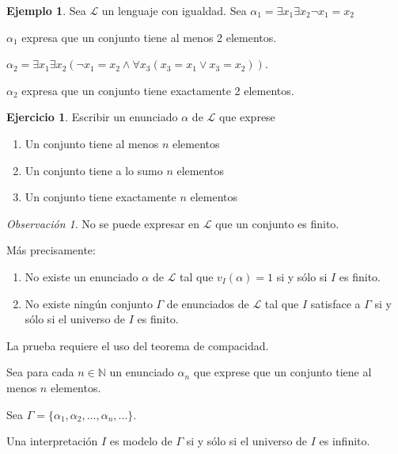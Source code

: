 \documentclass[a4paper,11pt]{article}
\theoremstyle{definition}
\newtheorem{exap}{Ejemplo}[section]
\newtheorem*{ejer}{Ejercicio}
\theoremstyle{remark}
\newtheorem*{remk}{Observación}
\def\NN{\mathbb{N}}
\def\LL{\ensuremath{\mathcal{L}}}
\begin{document}
\begin{exap}
    Sea $\LL$ un lenguaje con igualdad. Sea 
    $\alpha_1 = \exists x_1 \exists x_2 \lnot x_1 = x_2$
    
    $\alpha_1$ expresa que un conjunto tiene al menos 2 elementos.
    
    $\alpha_2 = \exists x_1 \exists x_2 (\lnot x_1 = x_2 \land 
    \forall x_3 (x_3 = x_1 \lor x_3 = x_2))$.
    
    $\alpha_2$ expresa que un conjunto tiene exactamente 2 elementos.
\end{exap}

\begin{ejer}
    Escribir un enunciado $\alpha$ de $\LL$ que exprese
    
    \begin{enumerate}[label=\emph{\alph*})]
        \item Un conjunto tiene al menos $n$ elementos
        
        \item Un conjunto tiene a lo sumo $n$ elementos
        
        \item Un conjunto tiene exactamente $n$ elementos
    \end{enumerate}
\end{ejer}

\begin{remk}
    No se puede expresar en $\LL$ que un conjunto es finito.
    
    Más precisamente:

    \begin{enumerate}[label=\emph{\alph*})]
        \item No existe un enunciado $\alpha$ de $\LL$ tal que
        $v_I(\alpha) = 1$ si y sólo si $I$ es finito.
        
        \item No existe ningún conjunto $\Gamma$ de enunciados
        de $\LL$ tal que $I$ satisface a $\Gamma$ si y sólo si
        el universo de $I$ es finito.
    \end{enumerate}

    La prueba requiere el uso del teorema de compacidad.
    
    Sea para cada $n \in \NN$ un enunciado $\alpha_n$ que
    exprese que un conjunto tiene al menos $n$ elementos.
    
    Sea $\Gamma = \{ \alpha_1, \alpha_2, \dots,\alpha_n, \dots \}$.
    
    Una interpretación $I$ es modelo de $\Gamma$ si y sólo si
    el universo de $I$ es infinito.
\end{remk}
\end{document}
